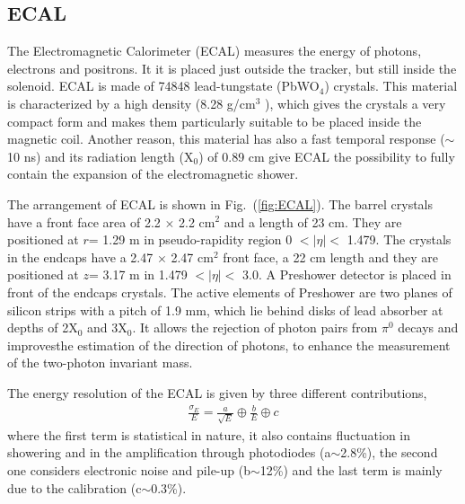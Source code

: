 \subsection{ECAL}

The Electromagnetic Calorimeter (ECAL) measures the energy of photons, electrons and positrons. It it is placed just outside the tracker, but still inside the solenoid. ECAL is made of 74848 lead-tungstate (PbWO$_{4}$) crystals. This material is characterized by a high density (8.28 g/cm$^3$ ), which gives the crystals a very compact form and makes them particularly suitable to be placed inside the magnetic coil. Another reason, this material has also a fast temporal response ($\sim$10 ns) and its radiation length (X$_{0}$) of 0.89 cm give ECAL the possibility to fully contain the expansion of the electromagnetic shower.

The arrangement of ECAL is shown in Fig.~(\ref{fig:ECAL}). The barrel crystals have a front face area of 2.2 $\times$ 2.2 cm$^2$ and a length of 23 cm. They are positioned at $r$= 1.29 m in pseudo-rapidity region 0 $< |\eta| <$ 1.479. The crystals in the endcaps have a 2.47 $\times$ 2.47 cm$^2$ front face, a 22 cm length and they are positioned at $z$= 3.17 m in 1.479 $< |\eta| <$ 3.0. A Preshower detector is placed in front of the endcaps crystals. The active elements of Preshower are two planes of silicon strips with a pitch of 1.9 mm, which lie behind disks of lead absorber at depths of 2X$_{0}$ and 3X$_{0}$. It allows the rejection of photon pairs from $\pi^{0}$ decays and improvesthe estimation of the direction of photons, to enhance the measurement of the two-photon invariant mass.

The energy resolution of the ECAL is given by three different contributions\cite{EcalReso},
\begin{align}
\frac{\sigma_{E}}{E}=\frac{a}{\sqrt{E}}\oplus\frac{b}{E}\oplus c
\end{align}
where the first term is statistical in nature, it also contains fluctuation in showering and in the amplification through photodiodes (a$\sim$2.8\%), the second one considers electronic noise and pile-up (b$\sim$12\%) and the last term is mainly due to the calibration (c$\sim$0.3\%).

